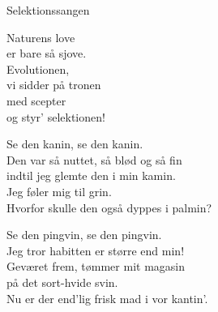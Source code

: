 \begin{song}{Selektionssangen}
  \begin{SBChorus}
    Naturens love\\
    er bare så sjove.\\
    Evolutionen,\\
    vi sidder på tronen\\
    med scepter\\
    og styr' selektionen!
  \end{SBChorus}


  \begin{SBVerse}
    Se den kanin, se den kanin.\\
    Den var så nuttet, så blød og så fin\\
    indtil jeg glemte den i min kamin.\\
    Jeg føler mig til grin.\\
    Hvorfor skulle den også dyppes i palmin?
  \end{SBVerse}

  \begin{SBVerse}
    Se den pingvin, se den pingvin.\\
    Jeg tror habitten er større end min!\\
    Geværet frem, tømmer mit magasin\\
    på det sort-hvide svin.\\
    Nu er der end'lig frisk mad i vor kantin'.
  \end{SBVerse}
\end{song}
\endsong